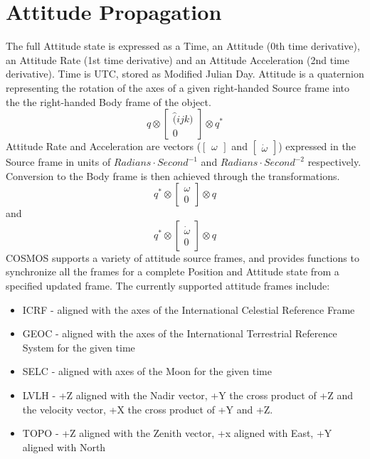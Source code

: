 \documentclass[12pt,letterpaper]{paper}
\begin{document}
\newpage
\section{Attitude Propagation}
The full Attitude state is expressed as a Time, an Attitude (0th time derivative), an Attitude Rate (1st time derivative) and an Attitude Acceleration (2nd time derivative). Time is UTC, stored as Modified Julian Day. Attitude is a quaternion representing the rotation of the axes of a given right-handed Source frame into the the right-handed Body frame of the object.
\[q \otimes \begin{bmatrix} \hat(ijk)\\0 \end{bmatrix} \otimes q^{*}\]
Attitude Rate and Acceleration are vectors ($\begin{bmatrix}\omega\end{bmatrix}$ and $\begin{bmatrix}\dot{\omega}\end{bmatrix}$) expressed in the Source frame in units of $Radians \cdot Second^{-1}$ and $Radians \cdot Second^{-2}$ respectively. Conversion to the Body frame is then achieved through the transformations.
\[q^{*} \otimes \begin{bmatrix} \omega\\0 \end{bmatrix} \otimes q\] and \[q^{*} \otimes \begin{bmatrix} \dot{\omega}\\0 \end{bmatrix} \otimes q\]
COSMOS supports a variety of attitude source frames, and provides functions to synchronize all the frames for a complete Position and Attitude state from a specified updated frame. The currently supported attitude frames include:
\begin{itemize}
\item ICRF - aligned with the axes of the International Celestial Reference Frame
\item GEOC - aligned with the axes of the International Terrestrial Reference System for the given time
\item SELC - aligned with axes of the Moon for the given time
\item LVLH - +Z aligned with the Nadir vector, +Y the cross product of +Z and the velocity vector, +X the cross product of +Y and +Z.
\item TOPO - +Z aligned with the Zenith vector, +x aligned with East, +Y aligned with North
\end{itemize}
\end{document}
